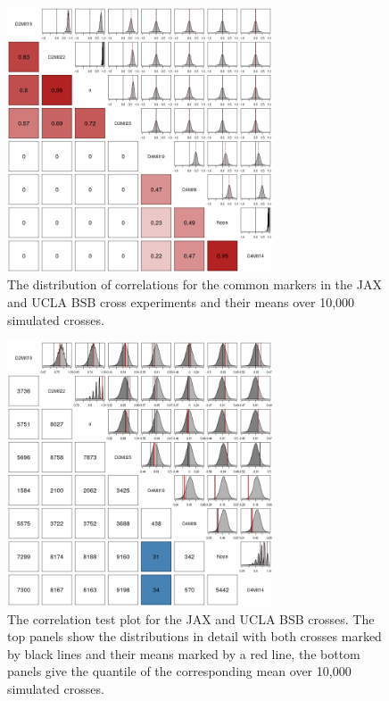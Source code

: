 \documentclass{article}
\begin{document}
\begin{figure}[htp]
  \begin{center}
      \includegraphics[width = 0.7\textwidth]{./img/bsbCorrDist.png}
  \end{center}
  \caption{The distribution of correlations for the common markers in the JAX and UCLA BSB cross experiments and their means over 10,000 simulated crosses.}
  \label{fig:bsbcorrDist}
\end{figure}

\begin{figure}[htp]
  \begin{center}
      \includegraphics[width = 0.7\textwidth]{./img/bsbCorrTest.png}
  \end{center}
  \caption{The correlation test plot for the JAX and UCLA BSB crosses. The top panels show the distributions in detail with both crosses marked by black lines and their means marked by a red line, the bottom panels give the quantile of the corresponding mean over 10,000 simulated crosses.}
  \label{fig:bsbcorrTest}
\end{figure}
\end{document}
